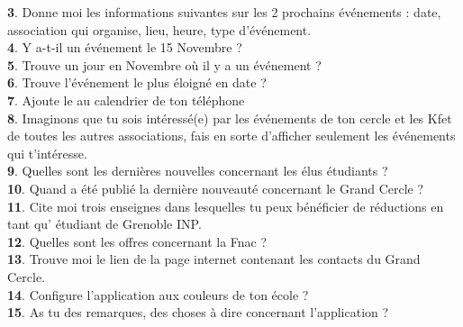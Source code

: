 \documentclass[a4paper, 11px]{article}
\begin{document}
\textbf{3}. Donne moi les informations suivantes sur les 2 prochains événements : date, association qui organise, lieu, heure, type d’événement.
  \\

\textbf{4}. Y a-t-il un événement le 15 Novembre ?
  \\

\textbf{5}. Trouve un jour en Novembre où il y a un événement ?	
  \\

\textbf{6}. Trouve l’événement le plus éloigné en date ?	
  \\

\textbf{7}. Ajoute le au calendrier de ton téléphone	
\\

\textbf{8}. Imaginons que tu sois intéressé(e) par les événements de ton cercle et les Kfet de toutes les autres associations, fais en sorte d’afficher seulement les événements qui t’intéresse.
\\

\textbf{9}. Quelles sont les dernières nouvelles concernant les élus étudiants ?	
  \\

\textbf{10}.  Quand a été publié la dernière nouveauté concernant le Grand Cercle ?	
\\

\textbf{11}.  Cite moi trois enseignes dans lesquelles tu peux bénéficier de réductions en tant qu' étudiant de Grenoble INP.
  \\

\textbf{12}. Quelles sont les offres concernant la Fnac ?	
\\

\textbf{13}.  Trouve moi le lien de la page internet contenant les contacts du Grand Cercle.	
  \\

\textbf{14}.  Configure l’application aux couleurs de ton école ?	
\\

\textbf{15}. As tu des remarques, des choses à dire concernant l’application ?	
  
\end{document}
